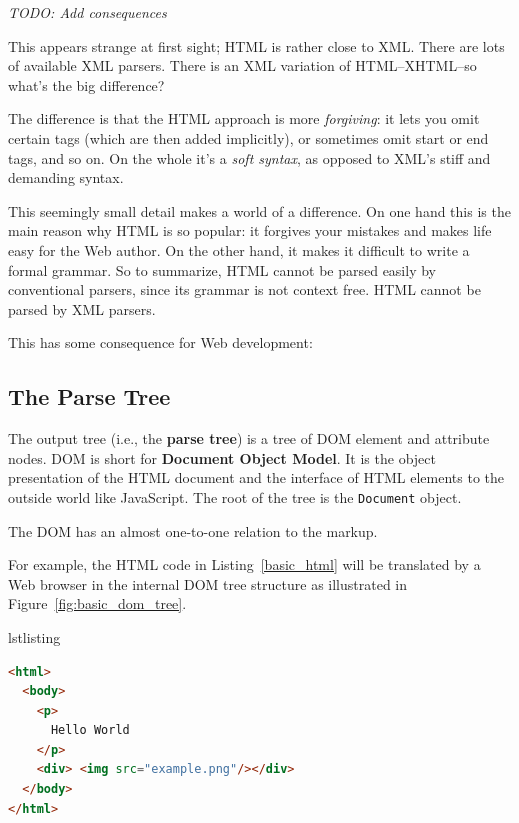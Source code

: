 \documentclass[a4paper, justified, notoc]{tufte-handout} %
\makeatletter
\newenvironment{listing}[1][htbp]
  {\ifvmode\else\unskip\fi\begin{@tufte@float}[#1]{lstlisting}{}}
  {\end{@tufte@float} } %
\makeatother
\begin{document}
\emph{TODO: Add consequences}


This appears strange at first sight; HTML is rather close to XML. There are lots of available XML parsers. There is an XML variation of HTML–XHTML–so what's the big difference?

The difference is that the HTML approach is more \emph{forgiving}: it lets you omit certain tags (which are then added implicitly), or sometimes omit start or end tags, and so on. On the whole it's a \emph{soft syntax}, as opposed to XML's stiff and demanding syntax.

This seemingly small detail makes a world of a difference. On one hand this is the main reason why HTML is so popular: it forgives your mistakes and makes life easy for the Web author. On the other hand, it makes it difficult to write a formal grammar. So to summarize, HTML cannot be parsed easily by conventional parsers, since its grammar is not context free. HTML cannot be parsed by XML parsers.

This has some consequence for Web development:



\subsection{The Parse Tree} %
\label{sub:the_parse_tree}

The output tree (i.e., the \textbf{parse tree}) is a tree of DOM element and attribute nodes. DOM is short for \textbf{Document Object Model}. It is the object presentation of the HTML document and the interface of HTML elements to the outside world like JavaScript. 
The root of the tree is the \texttt{Document} object.

The DOM has an almost one-to-one relation to the markup.

For example, the HTML code in Listing~\ref{basic_html} will be translated by a Web browser in the internal DOM tree structure as illustrated in Figure~\ref{fig:basic_dom_tree}.

\begin{listing}
\begin{lstlisting}[language=HTML]
<html>
  <body>
    <p>
      Hello World
    </p>
    <div> <img src="example.png"/></div>
  </body>
</html>
\end{lstlisting}
	\label{basic_html}
\end{listing}
\end{document}
